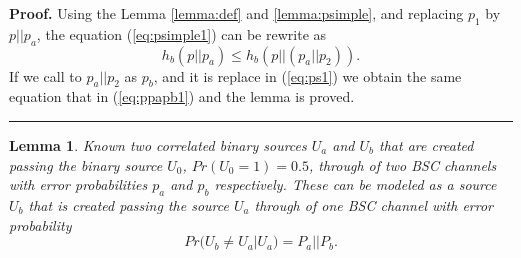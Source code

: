 \documentclass[a4paper,10pt]{article}
\newtheorem{mylemma}[mytheorem]{Lemma}
\newenvironment{myproof}[1][Proof]{\textbf{#1.} }{\ \rule{0.5em}{0.5em}}
\begin{document}
\begin{myproof}
\label{proof:ppapb} 
Using the Lemma \ref{lemma:def} and \ref{lemma:psimple}, and replacing 
$p_1$ by $p || p_a$, the equation (\ref{eq:psimple1}) can be rewrite as 
\begin{equation} \label{eq:ps1}
h_{b}(p || p_a) \leq h_{b}(p|| (p_a||p_2)).
\end{equation}
If we call to $p_a||p_2$ as $p_b$, and it is replace in (\ref{eq:ps1}) we obtain
the same equation that in (\ref{eq:ppapb1}) and the lemma is proved.
\end{myproof}
\begin{mdframed}[style=MDFStyGrayScreen]
\begin{mylemma}
\label{lemma:twoparbsc}
Known two correlated binary sources $U_a$ and $U_b$ that are created passing 
the binary source $U_0$, $Pr(U_0=1)=0.5$, through of two BSC channels with  
error probabilities $p_a$ and $p_b$ respectively. These can be modeled as a 
source $U_b$ that is created passing the source $U_a$ through of one BSC 
channel with  error probability 
\begin{equation} \label{eq:tpb0}
Pr(U_b \neq U_a|U_a)=P_a || P_b.
\end{equation}
\end{mylemma}
\end{mdframed}
\end{document}
